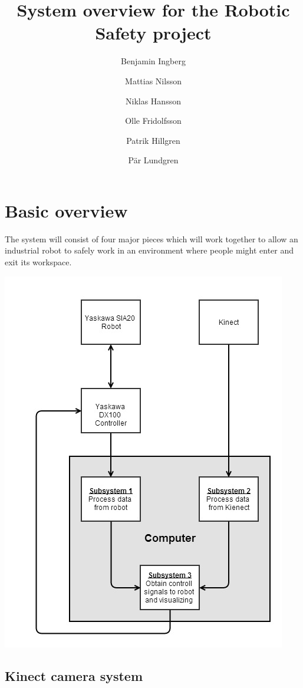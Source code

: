 \documentclass[10pt,a4paper,twocolumn,english]{article}
\title{System overview for the Robotic Safety project}
\author{Benjamin Ingberg \and Mattias Nilsson \and Niklas Hansson \and Olle Fridolfsson \and Patrik Hillgren \and Pär Lundgren }
\begin{document}
\twocolumn[\maketitle]
\clearpage
\twocolumn[\tableofcontents]
\clearpage

\section{Basic overview}

The system will consist of four major pieces which will work together to allow an industrial robot to safely work in an environment where people might enter and exit its workspace.

\includegraphics[width=\columnwidth]{robot_safety.jpg}

\subsection{Kinect camera system}
\end{document}
